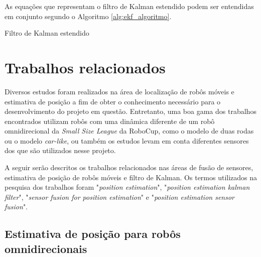 \documentclass[acronym, symbols, table, deposito]{fei}
\begin{document}
			As equações que representam o filtro de Kalman estendido podem ser entendidas em conjunto segundo o Algoritmo \ref{alg:ekf_algoritmo}.
			
			\begin{algorithm}
					\caption{Filtro de Kalman estendido}\label{alg:ekf_algoritmo}
			\end{algorithm}
			
\chapter{Trabalhos relacionados}\label{sec:trab_relacionados}
Diversos estudos foram realizados na área de localização de robôs móveis e estimativa de posição a fim de obter o conhecimento necessário para o desenvolvimento do projeto em questão. Entretanto, uma boa gama dos trabalhos encontrados utilizam robôs com uma dinâmica diferente de um robô omnidirecional da \textit{Small Size League} da RoboCup, como o modelo de duas rodas ou o modelo \textit{car-like}, ou também os estudos levam em conta diferentes sensores dos que são utilizados nesse projeto.

A seguir serão descritos os trabalhos relacionados nas áreas de fusão de sensores, estimativa de posição de robôs móveis e filtro de Kalman. Os termos utilizados na pesquisa dos trabalhos foram "\textit{position estimation}", "\textit{position estimation kalman filter}", "\textit{sensor fusion for position estimation}" e "\textit{position estimation sensor fusion}".

\section{Estimativa de posição para robôs omnidirecionais}
\end{document}
